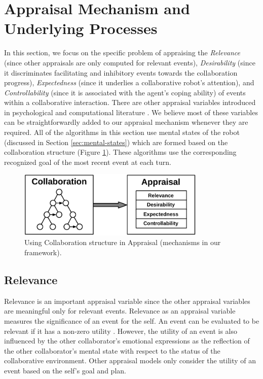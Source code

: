 \documentclass[12pt]{report}
\begin{document}
\section{Appraisal Mechanism and Underlying Processes}
\label{sec:appraisal}
In this section, we focus on the specific problem of appraising the
\textit{Relevance} (since other appraisals are only computed for relevant
events), \textit{Desirability} (since it discriminates facilitating and
inhibitory events towards the collaboration progress), \textit{Expectedness}
(since it underlies a collaborative robot's attention), and
\textit{Controllability} (since it is associated with the agent's coping
ability) of events within a collaborative interaction. There are other appraisal
variables introduced in psychological \cite{scherer:appraisal-processes} and
computational literature \cite{gratch:domain-independent}. We believe most of
these variables can be straightforwardly added to our appraisal mechanism
whenever they are required. All of the algorithms in this section use mental
states of the robot (discussed in Section \ref{sec:mental-states}) which are
formed based on the collaboration structure (Figure
\ref{fig:appraisal-collaboration}). These algorithms use the corresponding
recognized goal of the most recent event at each turn.

\begin{figure}[tbh]
  \centering
  \includegraphics[width=0.8\textwidth]{figure/appraisal-collaboration-croped.pdf}
  \caption{Using Collaboration structure in Appraisal (mechanisms in our
  framework).}
  \label{fig:appraisal-collaboration}
\end{figure}

\subsection{Relevance}
\label{sec:relevance}
Relevance is an important appraisal variable since the other appraisal variables
are meaningful only for relevant events. Relevance as an appraisal variable
measures the significance of an event for the self. An event can be evaluated to
be relevant if it has a non-zero utility \cite{marsella:ema-process-model}.
However, the utility of an event is also influenced by the other collaborator's
emotional expressions as the reflection of the other collaborator's mental state
with respect to the status of the collaborative environment. Other appraisal
models only consider the utility of an event based on the self's goal and plan.
\end{document}
